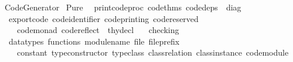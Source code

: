 %
\begin{isabellebody}%
%
%
\isadelimdocument
%
\endisadelimdocument
%
\isatagdocument
%
\isamarkuptrue%
%
\endisatagdocument
{\isafolddocument}%
%
\isadelimdocument
%
\endisadelimdocument
%
\isadelimtheory
%
\endisadelimtheory
%
\isatagtheory
{}\isamarkupfalse%
\ Code{\isacharunderscore}{\kern0pt}Generator\isanewline
{}\ Pure\isanewline
{}\isanewline
\ \ {\isachardoublequoteopen}print{\isacharunderscore}{\kern0pt}codeproc{\isachardoublequoteclose}\ {\isachardoublequoteopen}code{\isacharunderscore}{\kern0pt}thms{\isachardoublequoteclose}\ {\isachardoublequoteopen}code{\isacharunderscore}{\kern0pt}deps{\isachardoublequoteclose}\ {\isacharcolon}{\kern0pt}{\isacharcolon}{\kern0pt}\ diag\ \isanewline
\ \ {\isachardoublequoteopen}export{\isacharunderscore}{\kern0pt}code{\isachardoublequoteclose}\ {\isachardoublequoteopen}code{\isacharunderscore}{\kern0pt}identifier{\isachardoublequoteclose}\ {\isachardoublequoteopen}code{\isacharunderscore}{\kern0pt}printing{\isachardoublequoteclose}\ {\isachardoublequoteopen}code{\isacharunderscore}{\kern0pt}reserved{\isachardoublequoteclose}\isanewline
\ \ \ \ {\isachardoublequoteopen}code{\isacharunderscore}{\kern0pt}monad{\isachardoublequoteclose}\ {\isachardoublequoteopen}code{\isacharunderscore}{\kern0pt}reflect{\isachardoublequoteclose}\ {\isacharcolon}{\kern0pt}{\isacharcolon}{\kern0pt}\ thy{\isacharunderscore}{\kern0pt}decl\ \isanewline
\ \ {\isachardoublequoteopen}checking{\isachardoublequoteclose}\ \isanewline
\ \ {\isachardoublequoteopen}datatypes{\isachardoublequoteclose}\ {\isachardoublequoteopen}functions{\isachardoublequoteclose}\ {\isachardoublequoteopen}module{\isacharunderscore}{\kern0pt}name{\isachardoublequoteclose}\ {\isachardoublequoteopen}file{\isachardoublequoteclose}\ {\isachardoublequoteopen}file{\isacharunderscore}{\kern0pt}prefix{\isachardoublequoteclose}\isanewline
\ \ \ \ {\isachardoublequoteopen}constant{\isachardoublequoteclose}\ {\isachardoublequoteopen}type{\isacharunderscore}{\kern0pt}constructor{\isachardoublequoteclose}\ {\isachardoublequoteopen}type{\isacharunderscore}{\kern0pt}class{\isachardoublequoteclose}\ {\isachardoublequoteopen}class{\isacharunderscore}{\kern0pt}relation{\isachardoublequoteclose}\ {\isachardoublequoteopen}class{\isacharunderscore}{\kern0pt}instance{\isachardoublequoteclose}\ {\isachardoublequoteopen}code{\isacharunderscore}{\kern0pt}module{\isachardoublequoteclose}\isanewline

\end{isabellebody}
